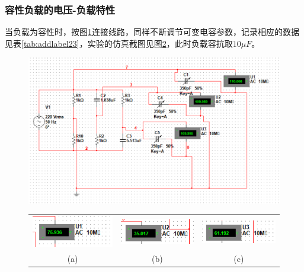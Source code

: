 \documentclass[12pt]{article}%
\begin{document}
\subsubsection{容性负载的电压-负载特性}
当负载为容性时，按图\ref{fig:a120}连接线路，同样不断调节可变电容参数，记录相应的数据见表\ref{tab:addlabel23}，实验的仿真截图见图\ref{fig:x11m}，此时负载容抗取$10\mu F$。
\begin{figure}[htbp]
\centering\includegraphics[width=\linewidth]{TIM20180531233912.png}
\caption{\heiti{}}\label{fig:a120}
\end{figure}
\begin{figure}[htbp]
\centering
\begin{tabular}{ccc}
\includegraphics[width=0.3\linewidth]{TIM20180607131314.png}&
\includegraphics[width=0.3\linewidth]{TIM20180607131327.png}&
\includegraphics[width=0.3\linewidth]{TIM20180607131344.png}\\
(a)&(b)&(c)\\
\end{tabular}
\caption{\heiti{}}\label{fig:x11m}
\end{figure}
\end{document}
